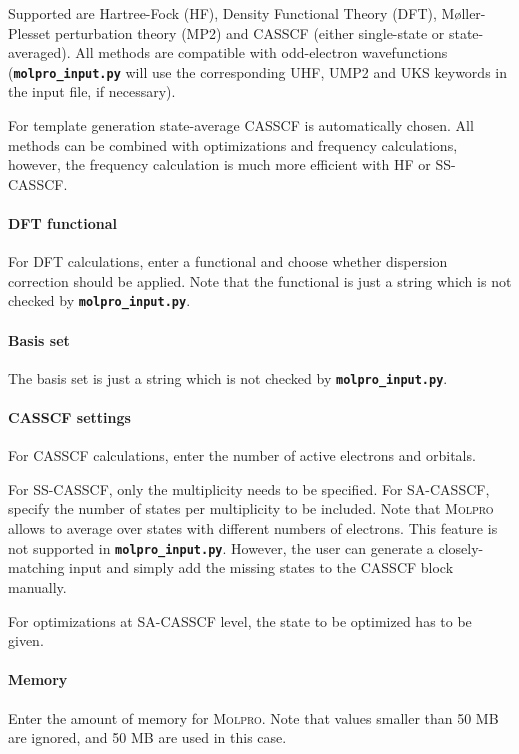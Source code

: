 \documentclass[a4paper,11pt,DIV=15,openany,twoside=false]{scrbook}
\newcommand{\ttt}[1]{\textbf{\texttt{#1}}}
\begin{document}
Supported are Hartree-Fock (HF), Density Functional Theory (DFT), M{\o}ller-Plesset perturbation theory (MP2) and CASSCF (either single-state or state-averaged). All methods are compatible with odd-electron wavefunctions (\ttt{molpro\_input.py} will use the corresponding UHF, UMP2 and UKS keywords in the input file, if necessary).

For template generation state-average CASSCF is automatically chosen. All methods can be combined with optimizations and frequency calculations, however, the frequency calculation is much more efficient with HF or SS-CASSCF. 

\paragraph{DFT functional}

For DFT calculations, enter a functional and choose whether dispersion correction should be applied. Note that the functional is just a string which is not checked by \ttt{molpro\_input.py}. 

\paragraph{Basis set}

The basis set is just a string which is not checked by \ttt{molpro\_input.py}. 

\paragraph{CASSCF settings}

For CASSCF calculations, enter the number of active electrons and orbitals. 

For SS-CASSCF, only the multiplicity needs to be specified. For SA-CASSCF, specify the number of states per multiplicity to be included. Note that \textsc{Molpro} allows to average over states with different numbers of electrons. This feature is not supported in \ttt{molpro\_input.py}. However, the user can generate a closely-matching input and simply add the missing states to the CASSCF block manually. 

For optimizations at SA-CASSCF level, the state to be optimized has to be given.

\paragraph{Memory}

Enter the amount of memory for \textsc{Molpro}. Note that values smaller than 50 MB are ignored, and 50 MB are used in this case.
\end{document}
